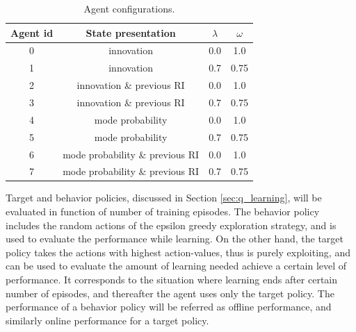 \documentclass[english, 12pt, a4paper, elec, utf8, a-1b, online]{aaltothesis}
\begin{document}
\begin{table}[t]
    \centering
    \begin{tabular}{|c | c | c |c |}
        \hline
        \textbf{Agent id} & \textbf{State presentation}  & $\lambda$  &  $\omega$ \\
        \hline
        0 & innovation & 0.0 & 1.0 \\ \hline
        1 & innovation & 0.7 & 0.75 \\ \hline
        2 & innovation \& previous RI &  0.0 & 1.0 \\ \hline
        3 & innovation \& previous RI & 0.7 & 0.75 \\ \hline
        4 & mode probability &  0.0 & 1.0 \\ \hline
        5 & mode probability & 0.7 & 0.75 \\ \hline 
        6 & mode probability \& previous RI &  0.0 & 1.0 \\ \hline 
        7 & mode probability \& previous RI & 0.7 & 0.75 \\
        \hline
    \end{tabular}
    \caption{Agent configurations.}
    \label{tab:agent_configurations}
\end{table}

Target and behavior policies, discussed in Section \ref{sec:q_learning}, will be evaluated in function of number of training episodes.
The behavior policy includes the random actions of the epsilon greedy exploration strategy, and is used to evaluate the performance while learning.
On the other hand, the target policy takes the actions with highest action-values, thus is purely exploiting, and can be used to evaluate the amount of learning needed achieve a certain level of performance.
It corresponds to the situation where learning ends after certain number of episodes, and thereafter the agent uses only the target policy.
The performance of a behavior policy will be referred as offline performance, and similarly online performance for a target policy.
\end{document}
